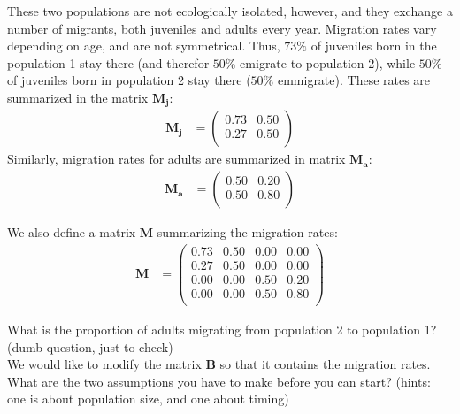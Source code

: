 \documentclass{article}\usepackage[]{graphicx}\usepackage[]{color}
\begin{document}
These two populations are not ecologically isolated, however, and they exchange a number of migrants, both juveniles and adults every year. 
Migration rates vary depending on age, and are not symmetrical. Thus, $73\%$ of juveniles born in the population 1 stay there (and therefor $50\%$ emigrate to population 2), while $50\%$ of juveniles born in population 2 stay there ($50\%$ emmigrate). 
These rates are summarized in the matrix $\boldsymbol{M_j}$:
\begin{align*}\boldsymbol{M_j} &=%
\begin{pmatrix}{}
  0.73 & 0.50 \\ 
  0.27 & 0.50 \\ 
  \end{pmatrix}
\end{align*}
Similarly, migration rates for adults are summarized in matrix $\boldsymbol{M_a}$:
\begin{align*}\boldsymbol{M_a} &=%
\begin{pmatrix}{}
  0.50 & 0.20 \\ 
  0.50 & 0.80 \\ 
  \end{pmatrix}
\end{align*}

We also define a matrix $\boldsymbol{M}$ summarizing the migration rates:
\begin{align*}\boldsymbol{M} &=%
\begin{pmatrix}{}
  0.73 & 0.50 & 0.00 & 0.00 \\ 
  0.27 & 0.50 & 0.00 & 0.00 \\ 
  0.00 & 0.00 & 0.50 & 0.20 \\ 
  0.00 & 0.00 & 0.50 & 0.80 \\ 
  \end{pmatrix}
\end{align*}


What is the proportion of adults migrating from population 2 to population 1? (dumb question, just to check)\\

We would like to modify the matrix $\boldsymbol{B}$ so that it contains the migration rates. \\
What are the two assumptions you have to make before you can start? 
(hints: one is about population size, and one about timing)\\%
\end{document}

